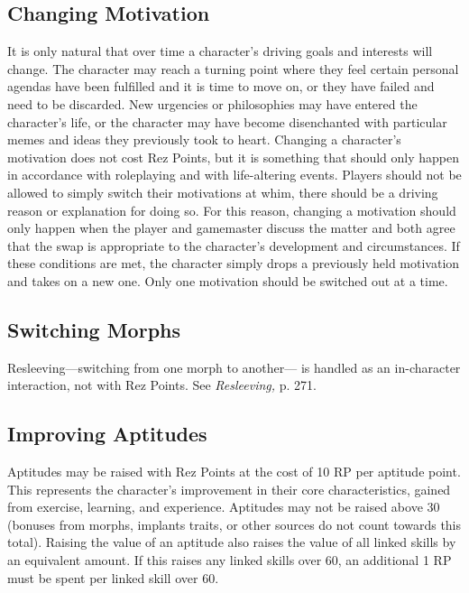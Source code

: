 \subsection{Changing Motivation}

It is only natural that over time a character's driving 
goals and interests will change. The character may 
reach a turning point where they feel certain personal 
agendas have been fulfilled and it is time to move on, 
or they have failed and need to be discarded. New 
urgencies or philosophies may have entered the 
character's life, or the character may have become 
disenchanted with particular memes and ideas they 
previously took to heart.
Changing a character's motivation does not cost 
Rez Points, but it is something that should only 
happen in accordance with roleplaying and with 
life-altering events. Players should not be allowed 
to simply switch their motivations at whim, there 
should be a driving reason or explanation for doing 
so. For this reason, changing a motivation should only 
happen when the player and gamemaster discuss the 
matter and both agree that the swap is appropriate to 
the character's development and circumstances.
If these conditions are met, the character simply 
drops a previously held motivation and takes on a 
new one. Only one motivation should be switched 
out at a time.

\subsection{Switching Morphs}

Resleeving—switching from one morph to another—
is handled as an in-character interaction, not with Rez 
Points. See \textit{Resleeving,} p. 271.

\subsection{Improving Aptitudes}

Aptitudes may be raised with Rez Points at the cost of 
10 RP per aptitude point. This represents the character's
improvement in their core characteristics, gained
from exercise, learning, and experience. Aptitudes may 
not be raised above 30 (bonuses from morphs, implants
traits, or other sources do not count towards
this total).
Raising the value of an aptitude also raises the 
value of all linked skills by an equivalent amount. If 
this raises any linked skills over 60, an additional 1 
RP must be spent per linked skill over 60.

